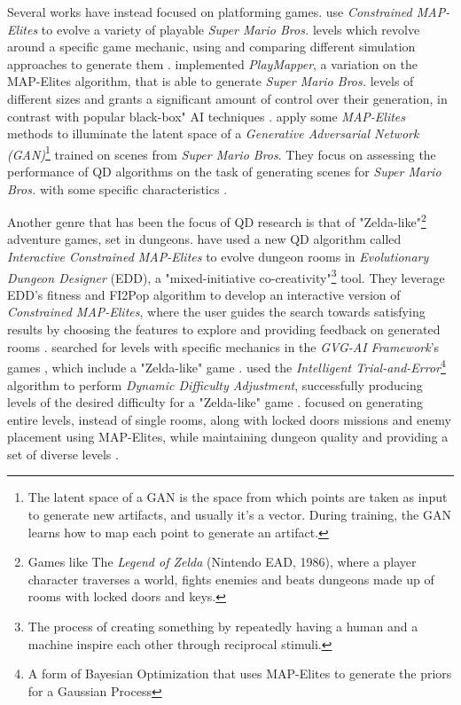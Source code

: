 Several works have instead focused on platforming games.  use \textit{Constrained MAP-Elites} to evolve a variety of playable \textit{Super Mario Bros.} levels which revolve around a specific game mechanic, using and comparing different simulation approaches to generate them \cite{khalifa_intentional_2019}.  implemented \textit{PlayMapper}, a variation on the MAP-Elites algorithm, that is able to generate \textit{Super Mario Bros.} levels of different sizes and grants a significant amount of control over their generation, in contrast with popular black-box" AI techniques \cite{warriar_playmapper_2019}. \citeauthor{fontaine_illuminating_2021} apply some \textit{MAP-Elites} methods to illuminate the latent space of a \textit{Generative Adversarial Network (GAN)}\footnote{The latent space of a GAN is the space from which points are taken as input to generate new artifacts, and usually it's a vector. During training, the GAN learns how to map each point to generate an artifact.} trained on scenes from \textit{Super Mario Bros}. They focus on assessing the performance of QD algorithms on the task of generating scenes for \textit{Super Mario Bros.} with some specific characteristics \cite{fontaine_illuminating_2021}.

Another genre that has been the focus of QD research is that of "Zelda-like"\footnote{Games like The \textit{Legend of Zelda} (Nintendo EAD, 1986), where a player character traverses a world, fights enemies and beats dungeons made up of rooms with locked doors and keys.} adventure games, set in dungeons. 
\citeauthor{alvarez_empowering_2019} have used a new QD algorithm called \textit{Interactive Constrained MAP-Elites} to evolve dungeon rooms in \textit{Evolutionary Dungeon Designer} (EDD), a "mixed-initiative co-creativity"\footnote{The process of creating something by repeatedly having a human and a machine inspire each other through reciprocal stimuli.} tool. They leverage EDD's fitness and FI2Pop algorithm to develop an interactive version of \textit{Constrained MAP-Elites}, where the user guides the search towards satisfying results by choosing the features to explore and providing feedback on generated rooms \cite{alvarez_empowering_2019}. 
\citeauthor{charity_mech-elites_2020} searched for levels with specific mechanics in the \textit{GVG-AI Framework}'s games \cite{perez-liebana_general_2019}, which include a "Zelda-like" game \cite{charity_mech-elites_2020}. 
 used the \textit{Intelligent Trial-and-Error}\footnote{A form of Bayesian Optimization that uses MAP-Elites to generate the priors for a Gaussian Process} algorithm to perform \textit{Dynamic Difficulty Adjustment}, successfully producing levels of the desired difficulty for a "Zelda-like" game \cite{gonzalez-duque_finding_2020}. \citeauthor{viana_illuminating_2022} focused on generating entire levels, instead of single rooms, along with locked doors missions and enemy placement using MAP-Elites, while maintaining dungeon quality and providing a set of diverse levels \cite{viana_illuminating_2022}.

